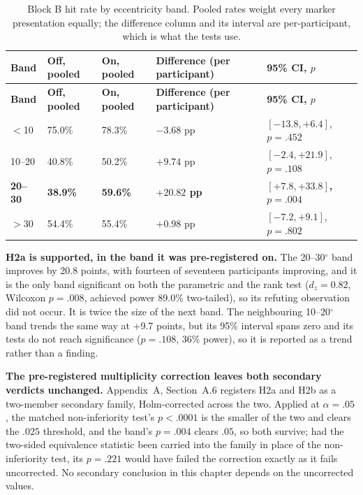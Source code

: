 \begin{longtable}{p{}|p{}|p{}|p{}|p{}}
\caption{Block B hit rate by eccentricity band. Pooled rates weight every marker presentation
equally; the difference column and its interval are per-participant, which is what the tests use.}
\label{tab:bands} \\
\hline
\textbf{Band} & \textbf{Off, pooled} & \textbf{On, pooled} & \textbf{Difference (per participant)} & \textbf{95\% CI, $p$} \\
\hline
\endfirsthead
\hline
\textbf{Band} & \textbf{Off, pooled} & \textbf{On, pooled} & \textbf{Difference (per participant)} & \textbf{95\% CI, $p$} \\
\hline
\endhead
\hline
$<$10\textdegree{} & 75.0\% & 78.3\% & $-3.68$ pp & $[-13.8, +6.4]$, $p = .452$ \\
10--20\textdegree{} & 40.8\% & 50.2\% & $+9.74$ pp & $[-2.4, +21.9]$, $p = .108$ \\
\textbf{20--30\textdegree{}} & \textbf{38.9\%} & \textbf{59.6\%} & \textbf{$+20.82$ pp} & \textbf{$[+7.8, +33.8]$, $p = .004$} \\
$>$30\textdegree{} & 54.4\% & 55.4\% & $+0.98$ pp & $[-7.2, +9.1]$, $p = .802$ \\
\hline
\end{longtable}

\textbf{H2a is supported, in the band it was pre-registered on.} The
20--30$^{\circ}$ band improves by 20.8 points, with fourteen of seventeen participants improving,
and it is the only band significant on both the parametric and the rank test ($d_z = 0.82$,
Wilcoxon $p = .008$, achieved power 89.0\% two-tailed), so its refuting observation did
not occur. It is twice the size of the next band. The neighbouring 10--20$^{\circ}$ band trends
the same way at +9.7 points, but its 95\% interval spans zero and its tests do not
reach significance ($p = .108$, 36\% power), so it is reported as a trend rather than a finding.

\textbf{The pre-registered multiplicity correction leaves both secondary verdicts unchanged.}
Appendix~A, Section~A.6 registers H2a and H2b as a two-member secondary family, Holm-corrected
across the two.
Applied at $\alpha = .05$, the matched non-inferiority test's $p < .0001$ is the smaller of the two
and clears the $.025$ threshold, and the band's $p = .004$ clears $.05$, so both survive; had the
two-sided equivalence statistic been carried into the family in place of the non-inferiority test,
its $p = .221$ would have failed the correction exactly as it fails uncorrected. No secondary
conclusion in this chapter depends on the uncorrected values.

